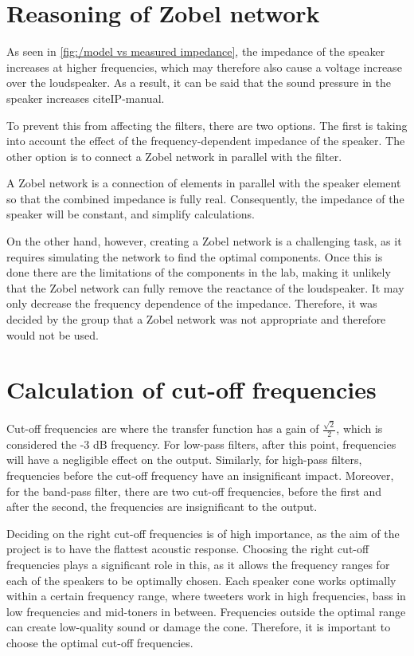 \section{Reasoning of Zobel network}
As seen in \ref{fig:/model vs measured impedance}, the impedance of the speaker increases at higher frequencies, which may therefore also cause a voltage increase over the loudspeaker. As a result, it can be said that the sound pressure in the speaker increases cite{IP-manual}. 

To prevent this from affecting the filters, there are two options. The first is taking into account the effect of the frequency-dependent impedance of the speaker. The other option is to connect a Zobel network in parallel with the filter. 

A Zobel network is a connection of elements in parallel with the speaker element so that the combined impedance is fully real. Consequently, the impedance of the speaker will be constant, and simplify calculations.

On the other hand, however, creating a Zobel network is a challenging task, as it requires simulating the network to find the optimal components. Once this is done there are the limitations of the components in the lab, making it unlikely that the Zobel network can fully remove the reactance of the loudspeaker. It may only decrease the frequency dependence of the impedance. Therefore, it was decided by the group that a Zobel network was not appropriate and therefore would not be used.  

\section{Calculation of cut-off frequencies}
Cut-off frequencies are where the transfer function has a gain of $\frac{\sqrt{2}}{2}$, which is considered the -3 dB frequency. For low-pass filters, after this point, frequencies will have a negligible effect on the output. Similarly, for high-pass filters, frequencies before the cut-off frequency have an insignificant impact. Moreover, for the band-pass filter, there are two cut-off frequencies, before the first and after the second, the frequencies are insignificant to the output. 

Deciding on the right cut-off frequencies is of high importance, as the aim of the project is to have the flattest acoustic response. Choosing the right cut-off frequencies plays a significant role in this, as it allows the frequency ranges for each of the speakers to be optimally chosen. Each speaker cone works optimally within a certain frequency range, where tweeters work in high frequencies, bass in low frequencies and mid-toners in between. Frequencies outside the optimal range can create low-quality sound or damage the cone. Therefore, it is important to choose the optimal cut-off frequencies. 

